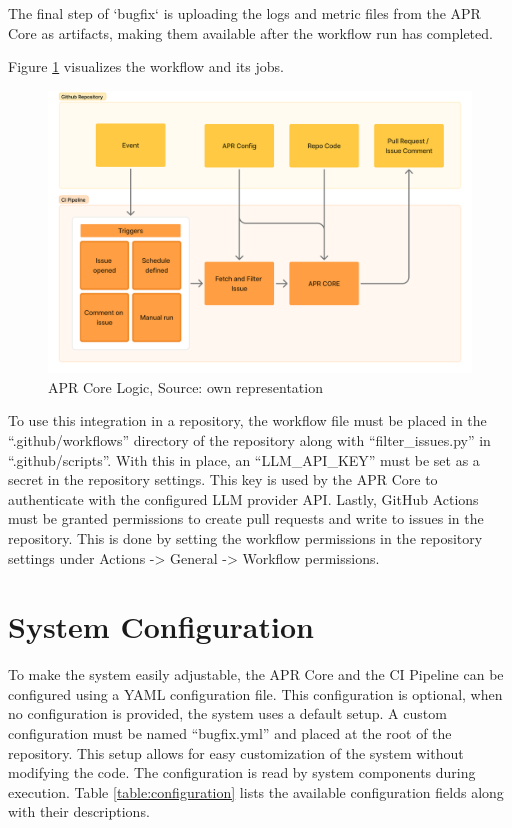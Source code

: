 The final step of `bugfix` is uploading the logs and metric files from the APR Core as artifacts, making them available after the workflow run has completed.

Figure \ref{fig:ci} visualizes the workflow and its jobs.

\begin{figure}[H]
    \centering
    \includegraphics[width=1\textwidth]{images/flowcharts/ci.png}
    \caption{APR Core Logic, Source: own representation}
    \label{fig:ci}
\end{figure}

To use this integration in a repository, the workflow file must be placed in the ``.github/workflows'' directory of the repository along with ``filter\_issues.py'' in ``.github/scripts''. With this in place, an ``LLM\_API\_KEY'' must be set as a secret in the repository settings. This key is used by the APR Core to authenticate with the configured \ac{LLM} provider API. Lastly, GitHub Actions must be granted permissions to create pull requests and write to issues in the repository. This is done by setting the workflow permissions in the repository settings under Actions -> General -> Workflow permissions.

\section{System Configuration}
To make the system easily adjustable, the APR Core and the CI Pipeline can be configured using a YAML configuration file. This configuration is optional, when no configuration is provided, the system uses a default setup. A custom configuration must be named ``bugfix.yml'' and placed at the root of the repository. This setup allows for easy customization of the system without modifying the code. The configuration is read by system components during execution. Table \ref{table:configuration} lists the available configuration fields along with their descriptions.

